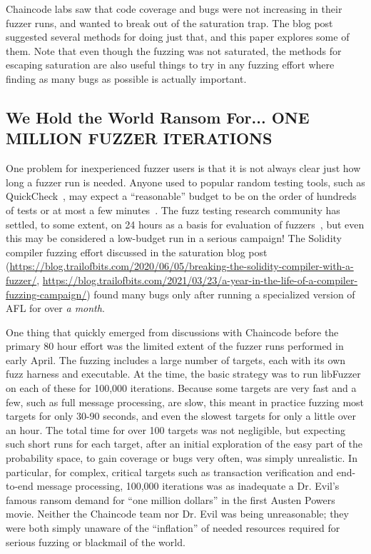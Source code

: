 Chaincode labs saw that code coverage and bugs were not increasing in their fuzzer runs, and wanted to break out of the saturation trap.  The blog post suggested several methods for doing just that, and this paper explores some of them.  Note that even though the fuzzing was not saturated, the methods for escaping saturation are also useful things to try in any fuzzing effort where finding as many bugs as possible is actually important.

\subsection{We Hold the World Ransom For... ONE MILLION FUZZER ITERATIONS}

One problem for inexperienced fuzzer users is that it is not always clear just how long a fuzzer run is needed.  Anyone used to popular random testing tools, such as QuickCheck~\cite{ClaessenH00}, may expect a ``reasonable'' budget to be on the order of hundreds of tests or at most a few minutes~\cite{HolmesLOC}.  The fuzz testing research community has settled, to some extent, on 24 hours as a basis for evaluation of fuzzers~\cite{evalfuzz}, but even this may be considered a low-budget run in a serious campaign!  The Solidity compiler fuzzing effort discussed in the saturation blog post (\url{https://blog.trailofbits.com/2020/06/05/breaking-the-solidity-compiler-with-a-fuzzer/}, \url{https://blog.trailofbits.com/2021/03/23/a-year-in-the-life-of-a-compiler-fuzzing-campaign/}) found many bugs only after running a specialized version of AFL for over \emph{a month}.

One thing that quickly emerged from discussions with Chaincode before the primary 80 hour effort was the limited extent of the fuzzer runs performed in early April.  The fuzzing includes a large number of targets, each with its own fuzz harness and executable.  At the time, the basic strategy was to run libFuzzer on each of these for 100,000 iterations.  Because some targets are very fast and a few, such as full message processing, are slow, this meant in practice fuzzing most targets for only 30-90 seconds, and even the slowest targets for only a little over an hour.  The total time for over 100 targets was not negligible, but expecting such short runs for each target, after an initial exploration of the easy part of the probability space, to gain coverage or bugs very often, was simply unrealistic.  In particular, for complex, critical targets such as transaction verification and end-to-end message processing, 100,000 iterations was as inadequate a Dr. Evil's famous ransom demand for ``one million dollars'' in the first Austen Powers movie.  Neither the Chaincode team nor Dr. Evil was being unreasonable; they were both simply unaware of the ``inflation'' of needed resources required for serious fuzzing or blackmail of the world.

